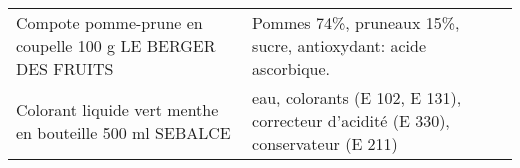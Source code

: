 \begin{longtable}{p{5cm}p{10cm}}
                                               Compote pomme-prune en coupelle 100 g LE BERGER DES FRUITS &                                                                                                                                                                                                                                                                                                                                                                                                                                                                                                                                                                                                                                                                                                                                                                                                                                                                                                                                                                          Pommes 74\%, pruneaux 15\%, sucre, antioxydant: acide ascorbique. \\
                                                 Colorant liquide vert menthe en bouteille 500 ml SEBALCE &                                                                                                                                                                                                                                                                                                                                                                                                                                                                                                                                                                                                                                                                                                                                                                                                                                                                                                                                                        eau, colorants (E 102, E 131), correcteur d'acidité (E 330), conservateur (E 211) \\

\end{longtable}

